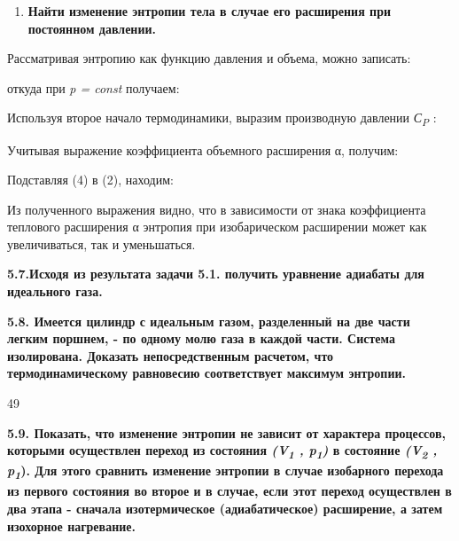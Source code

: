 \begin{enumerate}
\def\labelenumi{\arabic{enumi}.}
\setcounter{enumi}{5}
\item
  \textbf{Найти изменение энтропии тела в случае его расширения при
  постоянном давлении.}
\end{enumerate}

\solving{}

Рассматривая энтропию как функцию давления и объема, можно записать:


откуда при \emph{p = const} получаем:


Используя второе начало термодинамики, выразим производную
давлении \emph{С\textsubscript{P}} :


Учитывая выражение коэффициента объемного расширения α, получим:


Подставляя (4) в (2), находим:


Из полученного выражения видно, что в зависимости от знака коэффициента
теплового расширения α энтропия при изобарическом расширении может как
увеличиваться, так и уменьшаться.

\textbf{5.7.Исходя из результата задачи 5.1. получить уравнение адиабаты
для идеального газа.}

\textbf{5.8. Имеется цилиндр с идеальным газом, разделенный на две части
легким поршнем, - по одному молю газа в каждой части. Система
изолирована. Доказать непосредственным расчетом, что термодинамическому
равновесию соответствует максимум энтропии.}

49

\textbf{5.9. Показать, что изменение энтропии не зависит от характера
процессов, которыми осуществлен переход из состояния
\emph{(V\textsubscript{1} , p\textsubscript{1})} в состояние
\emph{(V\textsubscript{2} , p\textsubscript{1}}). Для этого сравнить
изменение энтропии в случае изобарного перехода из первого состояния во
второе и в случае, если этот переход осуществлен в два этапа - сначала
изотермическое (адиабатическое) расширение, а затем изохорное
нагревание.}

